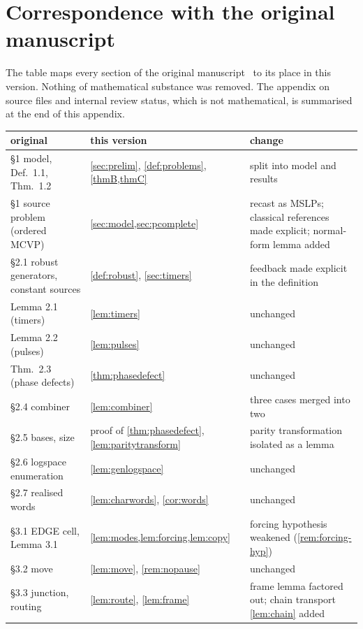 \section{Correspondence with the original manuscript}\label{app:map}

The table maps every section of the original manuscript~\cite{Src} to its place in this version.
Nothing of mathematical substance was removed. The appendix on source files and internal review status,
which is not mathematical, is summarised at the end of this appendix.

\begin{center}\small
\begin{longtable}{p{4.6cm}p{4.6cm}p{5.2cm}}\toprule
original & this version & change\\\midrule\endhead
\S1 model, Def.~1.1, Thm.~1.2 & \cref{sec:prelim}, \cref{def:problems}, \cref{thmB,thmC} & split into model and results\\
\S1 source problem (ordered MCVP) & \cref{sec:model,sec:pcomplete} & recast as MSLPs; classical references made explicit; normal-form lemma added\\
\S2.1 robust generators, constant sources & \cref{def:robust}, \cref{sec:timers} & feedback made explicit in the definition\\
Lemma 2.1 (timers) & \cref{lem:timers} & unchanged\\
Lemma 2.2 (pulses) & \cref{lem:pulses} & unchanged\\
Thm.~2.3 (phase defects) & \cref{thm:phasedefect} & unchanged\\
\S2.4 combiner & \cref{lem:combiner} & three cases merged into two\\
\S2.5 bases, size & proof of \cref{thm:phasedefect}, \cref{lem:paritytransform} & parity transformation isolated as a lemma\\
\S2.6 logspace enumeration & \cref{lem:genlogspace} & unchanged\\
\S2.7 realised words & \cref{lem:charwords}, \cref{cor:words} & unchanged\\
\S3.1 \textsf{EDGE} cell, Lemma 3.1 & \cref{lem:modes,lem:forcing,lem:copy} & forcing hypothesis weakened (\cref{rem:forcing-hyp})\\
\S3.2 move & \cref{lem:move}, \cref{rem:nopause} & unchanged\\
\S3.3 junction, routing & \cref{lem:route}, \cref{lem:frame} & frame lemma factored out; chain transport \cref{lem:chain} added\\

\end{longtable}
\end{center}
